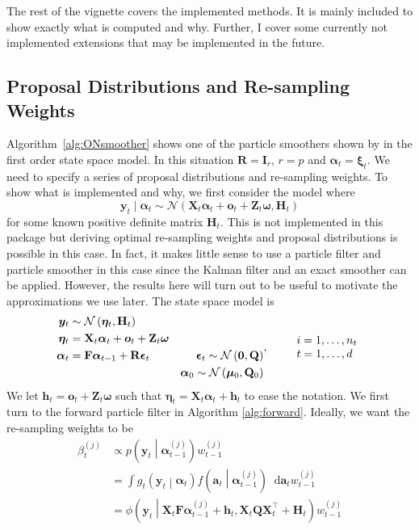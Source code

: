 \documentclass[notitlepage]{article}
\renewcommand{\vec}[1]{\bm{#1}}
\newcommand{\mat}[1]{\mathbf{#1}}
\newcommand{\Lparen}[1]{\left( #1\right)}
\newcommand{\Cond}[2]{ #1 \middle\vert  #2}
\newcommand*\diff{\mathop{}\!\mathrm{d}}
\newcommand{\optor}[2]{#1\Lparen{#2}}
\newcommand{\optorC}[3]{\optor{#1}{\Cond{#2}{#3}}}
\newcommand{\pdensC}[2]{\optorC{p}{#1}{#2}}
\newcommand{\normal}[2]{\optor{\mathcal{N}}{#1,#2}}
\newcommand{\normaldC}[3]{\optorC{\phi}{#1}{#2,#3}}
\newcommand{\partic}[3]{#1_{#2}^{\Lparen{#3}}}
\newcommand{\dimState}{p}
\newcommand{\dimRng}{r}
\begin{document}
The rest of the vignette covers the implemented methods. It is mainly included to show exactly what is 
computed and why. Further, I cover some currently not implemented extensions that may be implemented in the 
future. 


\subsection{Proposal Distributions and Re-sampling Weights}
Algorithm~\ref{alg:ONsmoother} shows one of the particle smoothers shown by
\cite{fearnhead10} in the first order state space model. In this situation $\mat R = \mat I_\dimRng$,
$\dimRng = \dimState$ and $\vec\alpha_t = \vec\xi_t$. We need to specify a series of proposal distributions and 
re-sampling weights. To show what is implemented and why, we first 
consider the model where %
%
$$\vec y_t \mid \vec\alpha_t \sim \normal{%
	\mat{X}_t\vec{\alpha}_t + \vec{o}_t +  \mat{Z}_t\vec{\omega}}{\mat H_t}$$%
%
for some known positive definite matrix $\mat H_t$. This is not implemented 
in this package but deriving 
optimal re-sampling weights and proposal distributions is possible in this case. 
In fact, it makes little sense to use a particle filter and particle smoother in this case
since the Kalman filter and an exact smoother can be applied. However, the results here
will turn out to be useful to motivate the approximations we use
later. The state space model is%
%
$$\begin{aligned}
 	\vec y_t & \sim \normal{\vec\eta_t}{\mat H_t} &  \\
%
 	\vec{\eta}_{t} &= \mat{X}_t\vec{\alpha}_t + \vec{o}_t +   
 	\mat{Z}_t\vec\omega & \\
%
 	\vec{\alpha}_t &= \mat{F}\vec{\alpha}_{t - 1} + \mat{R}\vec{\epsilon}_t&
 		\vec{\epsilon}_t \sim \normal{\vec{0}}{\mat{Q}} \\
%
	& \vphantom{a} &	\vec{\alpha}_0 \sim \normal{\vec\mu_0}{\mat{Q}_0}
\end{aligned}, \qquad
%
\begin{array}{l} i = 1, \dots, n_t \\ t = 1, \dots, d \end{array}$$%
%
We let $\vec h_t = \vec{o}_t + \mat{Z}_t\vec\omega$ such that 
$\vec \eta_t = \mat X_t\vec \alpha_t + \vec h_t$ to ease the notation.  
We first turn to the forward particle filter in Algorithm \ref{alg:forward}. Ideally, we 
want the re-sampling weights to be 
%
\begin{align}\label{eq:fwReWeight}
\partic\beta tj &\propto \pdensC{\vec y_t}{\partic{\vec\alpha}{t-1}j}\partic w{t-1}j \\
	&=\int \optorC{g_t}{\vec y_t}{\vec\alpha_t}
		\optorC{f}{\vec a_t}{\partic{\vec\alpha}{t-1}j}\diff\vec a_t \partic w{t-1}j \nonumber\\
	&= \normaldC{\vec y_t }{\mat X_t\mat F\partic{\vec\alpha}{t-1}j + \vec h_t}{%
	\mat X_t \mat Q \mat X_t^\top + \mat H_t}
	\partic w{t-1}j\nonumber
\end{align}%
\end{document}
